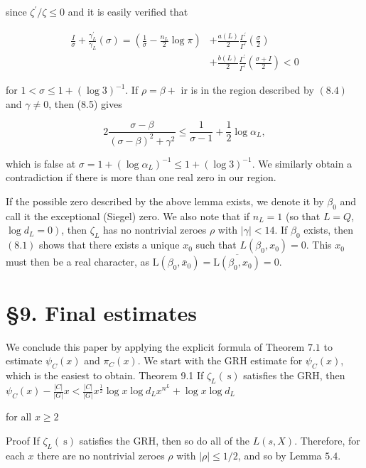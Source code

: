 since $\zeta^{\prime} / \zeta \leqslant 0$ and it is easily verified that

$$
\begin{aligned}
\frac{I}{\sigma}+\frac{\gamma_{L}^{\prime}}{\gamma_{L}}(\sigma)=\left(\frac{1}{\sigma}-\frac{n_{L}}{2} \log \pi\right) &+\frac{a(L)}{2} \frac{\Gamma^{\prime}}{\Gamma^{\prime}}\left(\frac{\sigma}{2}\right) \\
&+\frac{b(L)}{2} \frac{\Gamma^{\prime}}{\Gamma^{\prime}}\left(\frac{\sigma+I}{2}\right)<0
\end{aligned}
$$

for $1<\sigma \leqslant 1+(\log 3)^{-1}$. If $\rho=\beta+$ ir is in the region described by $(8.4)$ and $\gamma \neq 0$, then (8.5) gives

$$
2 \frac{\sigma-\beta}{(\sigma-\beta)^{2}+\gamma^{2}} \leqslant \frac{1}{\sigma-1}+\frac{1}{2} \log \alpha_{L},
$$

which is false at $\sigma=1+\left(\log \alpha_{L}\right)^{-1} \leqslant 1+(\log 3)^{-1}$. We similarly obtain a contradiction if there is more than one real zero in our region.

If the possible zero described by the above lemma exists, we denote it by $\beta_{0}$ and call it the exceptional (Siegel) zero. We also note that if $n_{L}=1$ (so that $L=Q$, $\left.\log d_{L}=0\right)$, then $\zeta_{L}$ has no nontrivial zeroes $\rho$ with $|\gamma|<14$. If $\beta_{0}$ exists, then $(8.1)$ shows that there exists 
a unique $x_{0}$ such that $L\left(\beta_{0}, x_{0}\right)=0$. This $x_{0}$ must then be
a real character, as $\mathrm{L}\left(\beta_{0}, \bar{x}_{0}\right)=\overline{\mathrm{L}\left(\beta_{0}, x_{0}\right)}=0$.

\section{§9. Final estimates}

We conclude this paper by applying the explicit formula of Theorem $7.1$ to estimate $\psi_{C}(x)$ and $\pi_{C}(x)$. We start with the GRH estimate for $\psi_{C}(x)$, which is the easiest to obtain. Theorem 9.1 If $\zeta_{L}(\mathrm{~s})$ satisfies the GRH, then $\psi_{C}(x)-\frac{|C|}{|G|} x<\frac{|C|}{|G|} x^{\frac{1}{2}} \log x \log d_{L} x^{n^{L}}+\log x \log d_{L}$

for all $x \geqslant 2$

Proof If $\zeta_{L}(\mathrm{~s})$ satisfies the GRH, then so do all of the $L(s, X)$. Therefore, for each $x$ there are no nontrivial zeroes $\rho$ with $|\rho| \leqslant 1 / 2$, and so by Lemma $5.4$.

